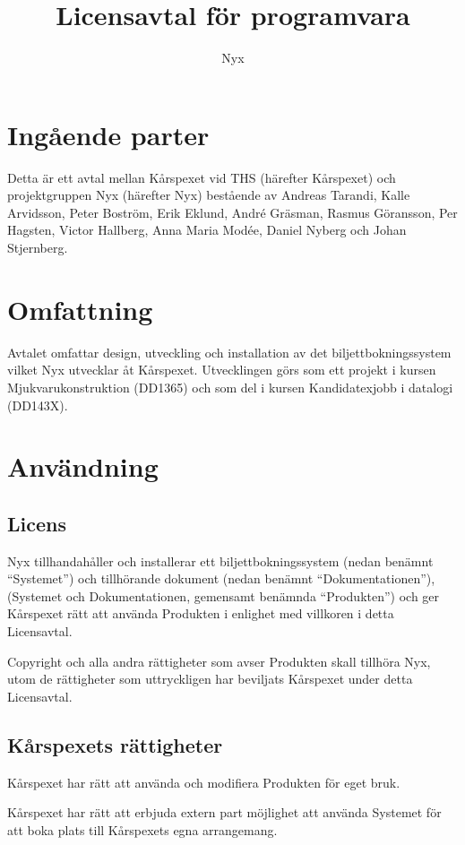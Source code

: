 \documentclass[a4paper,11pt]{article}
\title{Licensavtal för programvara}
\author{Nyx}
\begin{document}
\maketitle

\section*{Ingående parter}
Detta är ett avtal mellan Kårspexet vid THS (härefter Kårspexet) och projektgruppen Nyx (härefter Nyx) bestående av Andreas Tarandi, Kalle Arvidsson, Peter Boström, Erik Eklund, André Gräsman, Rasmus Göransson, Per Hagsten, Victor Hallberg, Anna Maria Modée, Daniel Nyberg och Johan Stjernberg.

\section{Omfattning}
Avtalet omfattar design, utveckling och installation av det biljettbokningssystem vilket Nyx utvecklar åt Kårspexet. Utvecklingen görs som ett projekt i kursen Mjukvarukonstruktion (DD1365) och som del i kursen Kandidatexjobb i datalogi (DD143X). 

\section{Användning}

\subsection{Licens}
Nyx tillhandahåller och installerar ett biljettbokningssystem (nedan benämnt ``Systemet'') och tillhörande dokument (nedan benämnt ``Dokumentationen''), (Systemet och Dokumentationen, gemensamt benämnda ``Produkten'') och ger Kårspexet rätt att använda Produkten i enlighet med villkoren i detta Licensavtal.

Copyright och alla andra rättigheter som avser Produkten skall tillhöra Nyx, utom de rättigheter som uttryckligen har beviljats Kårspexet under detta Licensavtal.

\subsection{Kårspexets rättigheter}
Kårspexet har rätt att använda och modifiera Produkten för eget bruk.

Kårspexet har rätt att erbjuda extern part möjlighet att använda Systemet för att boka plats till Kårspexets egna arrangemang. 
\end{document}
